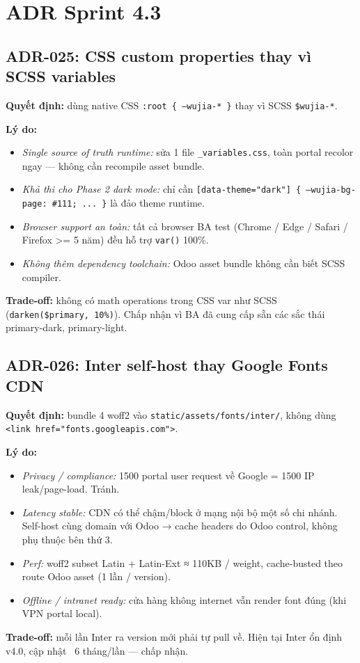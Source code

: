 \section{ADR Sprint 4.3}

\subsection{ADR-025: CSS custom properties thay vì SCSS variables}

\textbf{Quyết định:} dùng native CSS \texttt{:root \{ --wujia-* \}} thay vì SCSS \texttt{\$wujia-*}.

\textbf{Lý do:}
\begin{itemize}
\item \emph{Single source of truth runtime:} sửa 1 file \texttt{\_variables.css}, toàn portal recolor ngay --- không cần recompile asset bundle.
\item \emph{Khả thi cho Phase 2 dark mode:} chỉ cần \texttt{[data-theme="dark"] \{ --wujia-bg-page: \#111; ... \}} là đảo theme runtime.
\item \emph{Browser support an toàn:} tất cả browser BA test (Chrome / Edge / Safari / Firefox >= 5 năm) đều hỗ trợ \texttt{var()} 100\%.
\item \emph{Không thêm dependency toolchain:} Odoo asset bundle không cần biết SCSS compiler.
\end{itemize}

\textbf{Trade-off:} không có math operations trong CSS var như SCSS (\texttt{darken(\$primary, 10\%)}). Chấp nhận vì BA đã cung cấp sẵn các sắc thái primary-dark, primary-light.

\subsection{ADR-026: Inter self-host thay Google Fonts CDN}

\textbf{Quyết định:} bundle 4 woff2 vào \texttt{static/assets/fonts/inter/}, không dùng \texttt{<link href="fonts.googleapis.com">}.

\textbf{Lý do:}
\begin{itemize}
\item \emph{Privacy / compliance:} 1500 portal user request về Google = 1500 IP leak/page-load. Tránh.
\item \emph{Latency stable:} CDN có thể chậm/block ở mạng nội bộ một số chi nhánh. Self-host cùng domain với Odoo → cache headers do Odoo control, không phụ thuộc bên thứ 3.
\item \emph{Perf:} woff2 subset Latin + Latin-Ext ≈ 110KB / weight, cache-busted theo route Odoo asset (1 lần / version).
\item \emph{Offline / intranet ready:} cửa hàng không internet vẫn render font đúng (khi VPN portal local).
\end{itemize}

\textbf{Trade-off:} mỗi lần Inter ra version mới phải tự pull về. Hiện tại Inter ổn định v4.0, cập nhật ~6 tháng/lần --- chấp nhận.

